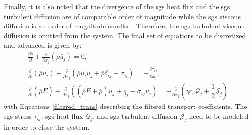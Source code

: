 Finally, it is also noted that the divergence of the \gls{sgs} heat flux and the \gls{sgs} turbulent diffusion are of comparable order of magnitude while the \gls{sgs} viscous diffusion is an order of magnitude smaller \cite{LES_Comp}. Therefore, the \gls{sgs} turbulent viscous diffusion is omitted from the system. The final set of equations to be discretized and advanced is given by:  
\begin{subequations} \label{filtered_NSE_FINAL}
\begin{align}
  \frac{\partial\overline{\rho}}{\partial t} + \frac{\partial }{\partial x_j} \left( \overline{\rho}\widetilde{ u_j} \right) = 0, \label{NSE_mass_FINAL} \\
  \frac{\partial}{\partial t} \left( \overline{\rho}\widetilde{ u_i }\right) + \frac{\partial}{\partial x_j} \left(\overline{\rho}\widetilde{ u_i} \widetilde{u_j} + \overline{p }\delta_{ij} - \widetilde{\sigma_{ij}} \right) = - \frac{\partial \tau_{ij}}{\partial x_j}, \label{NSE_mom_FINAL}  \\
  \frac{\partial}{\partial t} \left( \overline{\rho}\widetilde{ E} \right) + \frac{\partial}{\partial x_j} \left(\left( \overline{\rho}\widetilde{ E}+\overline{p} \right)\widetilde{u_j} + \widetilde{q_j} - \widetilde{\sigma_{ij}}\widetilde{ u_i}\right) = - \frac{\partial}{\partial x_j } \left( \gamma c_v \mathcal{Q}_j + \dfrac{1}{2} \mathcal{J}_j \right)  \label{NSE_E_FINAL}
\end{align}
\end{subequations}
with Equations \ref{filtered_trans} describing the filtered transport coefficients. The \gls{sgs} stress $\tau_{ij}$, \gls{sgs} heat flux $\mathcal{Q}_{j}$, and \gls{sgs} turbulent diffusion $\mathcal{J}_j$ need to be modeled in order to close the system. 



